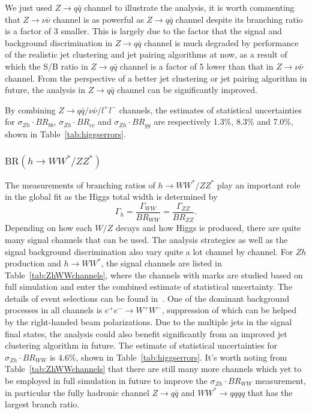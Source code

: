 We just used $Z\to q\bar{q}$ channel to illustrate the analysis, it is worth commenting that 
$Z\to\nu\bar{\nu}$ channel is as powerful as $Z\to q\bar{q}$ channel despite its branching ratio
is a factor of 3 smaller. This is largely due to the factor that the signal and background 
discrimination in $Z\to q\bar{q}$  channel is much degraded by performance of 
the realistic jet clustering and jet pairing algorithms at now, 
as a result of which the S/B ratio in $Z\to q\bar{q}$ channel is a factor of 5
lower than that in $Z\to\nu\bar{\nu}$ channel. From the perspective of a better jet clustering
or jet pairing algorithm in future, the analysis in $Z\to q\bar{q}$ channel can be 
significantly improved.

By combining $Z\to q\bar{q}/\nu\bar{\nu}/l^+l^-$ channels, 
the estimates of statistical uncertainties for $\sigma_{Zh}\cdot BR_{bb}$,
$\sigma_{Zh}\cdot BR_{cc}$ and $\sigma_{Zh}\cdot BR_{gg}$ are respectively
1.3\%, 8.3\% and 7.0\%, shown in Table~\ref{tab:higgserrors}.

\subsubsection{$\mathrm{BR}(h\to WW^*/ZZ^*)$}
The measurements of branching ratios of $h\to WW^*/ZZ^*$ play an important role
in the global fit as the Higgs total width is determined by
$$\Gamma_h=\frac{\Gamma_{WW}}{BR_{WW}}=\frac{\Gamma_{ZZ}}{BR_{ZZ}}.$$
Depending on how each $W/Z$ decays and how Higgs is produced, there
are quite many signal channels that can be used. The analysis strategies as well as
the signal background discrimination also vary quite a lot channel by channel.
For $Zh$ production and $h\to WW^*$, 
the signal channels are listed in Table~\ref{tab:ZhWWchannels}, where the channels
with marks are studied based on full simulation and enter the combined estimate of 
statistical uncertainty. The details of event selections can be found in~\cite{Ono:2012,Barklow:2017,Liao:2017}.
One of the dominant background processes in all channels is $e^+e^-\to W^+W^-$, suppression of which 
can be helped by the right-handed beam polarizations.
Due to the multiple jets in the signal final states, the analysis could also benefit significantly 
from an improved jet clustering algorithm in future.
The estimate of statistical uncertainties for $\sigma_{Zh}\cdot BR_{WW}$ is
4.6\%, shown in Table~\ref{tab:higgserrors}. It's worth noting from Table~\ref{tab:ZhWWchannels}
that there are still many more channels which yet to be employed in full simulation in future 
to improve the $\sigma_{Zh}\cdot BR_{WW}$ measurement, in particular the fully hadronic channel 
 $Z\to q\bar{q}$ and $WW^*\to qqqq$ that has the largest branch ratio.

